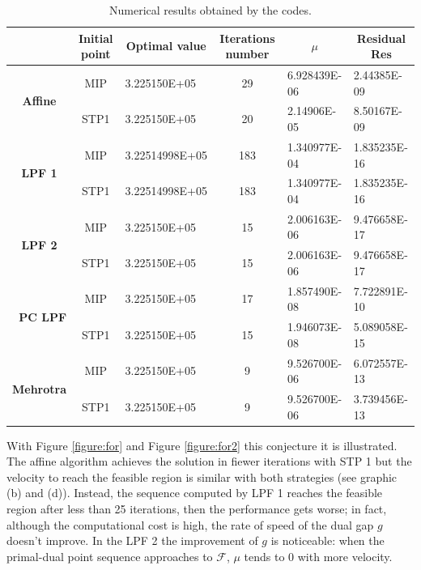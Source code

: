 \documentclass[a4paper,10 pt,titlepage,twoside]{book}
\theoremstyle{plain}
\theoremstyle{definition}
\theoremstyle{remark}
\begin{document}
\begin{table}[]\caption{\label{table:PNV}Numerical results obtained by the codes.}
	\begin{tabular}{cclcll}
		\hline		\textbf{} & \textbf{Initial point} & \multicolumn{1}{c}{\textbf{Optimal value}} & \textbf{Iterations number} & \multicolumn{1}{c}{\textbf{$\mu$}} & \multicolumn{1}{c}{\textbf{Residual} Res} \\ \hline
		\multicolumn{1}{c|}{\multirow{2}{*}{\textbf{Affine}}} & MIP & 3.225150E+05 & 29 & 6.928439E-06 & 2.44385E-09 \\
		\multicolumn{1}{c|}{} & STP1 & 3.225150E+05 & 20 & 2.14906E-05 & 8.50167E-09 \\ \hline
		\multicolumn{1}{c|}{\multirow{2}{*}{\textbf{LPF 1}}} & MIP & 3.22514998E+05 & 183 & 1.340977E-04 & 1.835235E-16 \\
		\multicolumn{1}{c|}{} & STP1 & 3.22514998E+05 & 183 & 1.340977E-04 & 1.835235E-16 \\ \hline
		\multicolumn{1}{c|}{\multirow{2}{*}{\textbf{LPF 2}}} & MIP & 3.225150E+05 & 15 & 2.006163E-06 & 9.476658E-17 \\
		\multicolumn{1}{c|}{} & STP1 & 3.225150E+05 & 15 & 2.006163E-06 & 9.476658E-17 \\ \hline
		\multicolumn{1}{r|}{\multirow{2}{*}{\textbf{PC LPF}}} & MIP & 3.225150E+05 & 17 & 1.857490E-08 & 7.722891E-10 \\
		\multicolumn{1}{r|}{} & STP1 & 3.225150E+05 & 15 & 1.946073E-08 & 5.089058E-15 \\ \hline
		\multicolumn{1}{c|}{\multirow{2}{*}{\textbf{Mehrotra}}} & MIP & 3.225150E+05 & 9 & 9.526700E-06 & 6.072557E-13 \\
		\multicolumn{1}{c|}{} & STP1 & 3.225150E+05 & 9 & 9.526700E-06 & 3.739456E-13 \\ \hline
	\end{tabular}
\end{table}
With Figure \ref{figure:for} and Figure \ref{figure:for2} this conjecture it is illustrated.\\ 
The affine algorithm achieves the solution in fiewer iterations with STP 1 but the velocity to reach the feasible region is similar with both strategies (see graphic (b) and (d)). Instead, the sequence computed by LPF 1 reaches the feasible region after less than 25 iterations, then the performance gets worse;  in fact, although the computational cost is high, the rate of speed of the dual gap $g$ doesn't improve.  
In the LPF 2 the improvement of $g$ is noticeable: when the primal-dual point sequence approaches to $\mathcal{F}$, $\mu$ tends to 0 with more velocity.\\ 
\end{document}
